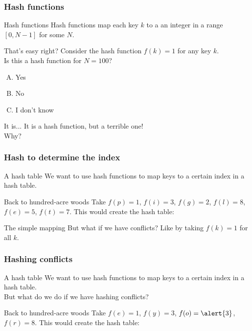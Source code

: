 \begin{frame}
	\frametitle{Hash functions}
	
		\begin{block}{Hash functions}
			Hash functions map each key $k$ to a an integer in a range $[0, N-1]$ for some $N$.\\
		\end{block}	
		\pause
		\begin{block}{That's easy right?}
			Consider the hash function $f(k) = 1$ for any key $k$.\\
			Is this a hash function for $N=100$?
			\begin{enumerate}[A.]
				\item Yes
				\item No
				\item I don't know
			\end{enumerate}
		\end{block}

		\pause
			\begin{block}{It is...}
				It is a hash function, but a terrible one!\\
				Why?
			\end{block}	
\end{frame}

\begin{frame}
	\frametitle{Hash to determine the index}

	\begin{block}{A hash table}
		We want to use hash functions to map keys to a certain index in a hash table.
	\end{block}
	\pause
	\begin{block}{Back to hundred-acre woods}
		Take $f(p) = 1$, $f(i) = 3$, $f(g) = 2$, $f(l) = 8$, $f(e) = 5$, $f(t) = 7$.
		\pause
		This would create the hash table:
		\begin{center}
			
		\end{center}
	\end{block}	
	\pause
	\begin{block}{The simple mapping}
		But what if we have conflicts? Like by taking $f(k)=1$ for all $k$.
	\end{block}	
\end{frame}

\begin{frame}
	\frametitle{Hashing conflicts}
	\begin{block}{A hash table}
		We want to use hash functions to map keys to a certain index in a hash table.\\
		But what do we do if we have hashing conflicts?
	\end{block}
	\pause
	\begin{block}{Back to hundred-acre woods}
		Take $f(e) = 1$, $f(y) = 3$, $f(o) = \alert{3}$, $f(r) = 8$.
		\pause
		This would create the hash table:
	\end{block}	
\end{frame}

